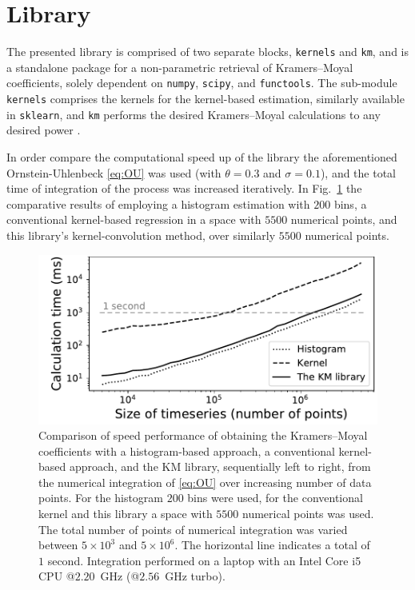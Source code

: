 \documentclass[showpacs,showkeys,10pt,onecolumn,superscriptaddress,notitlepage]{revtex4-1}
\begin{document}
\section{Library}
The presented library is comprised of two separate blocks, \texttt{kernels} and \texttt{km}, and is a standalone package for a non-parametric retrieval of Kramers--Moyal coefficients, solely dependent on \texttt{numpy}, \texttt{scipy}, and \texttt{functools}.
The sub-module \texttt{kernels} comprises the kernels for the kernel-based estimation, similarly available in \texttt{sklearn}, and \texttt{km} performs the desired Kramers--Moyal calculations to any desired power \cite{scikitlearn}.

In order compare the computational speed up of the library the aforementioned Ornstein-Uhlenbeck \eqref{eq:OU} was used (with $\theta = 0.3$ and $\sigma=0.1$), and the total time of integration of the process was increased iteratively.
In Fig.~\ref{fig:3} the comparative results of employing a histogram estimation with $200$ bins, a conventional kernel-based regression in a space with $5500$ numerical points, and this library's kernel-convolution method, over similarly $5500$ numerical points.

\begin{figure}[H]
    \centering
    \includegraphics[width=0.45\linewidth]{Fig_3.pdf}
    \caption{Comparison of speed performance of obtaining the Kramers--Moyal coefficients with a histogram-based approach, a conventional kernel-based approach, and the KM library, sequentially left to right, from the numerical integration of \eqref{eq:OU} over increasing number of data points.
    For the histogram $200$ bins were used, for the conventional kernel and this library a space with $5500$ numerical points was used.
    The total number of points of numerical integration was varied between $5\times10^3$ and $5\times10^6$.
    The horizontal line indicates a total of $1$ second.
    Integration performed on a laptop with an Intel Core i5 CPU @$2.20$~GHz (@$2.56$~GHz turbo).}\label{fig:3}
\end{figure}

\end{document}

